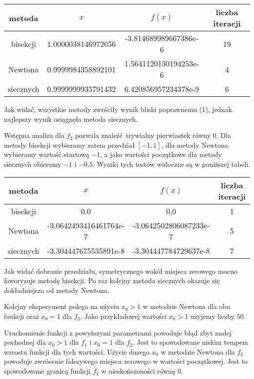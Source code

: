 \documentclass{article}
\begin{document}
\begin{tabular}{|c|c|c|c|}
\hline
metoda    & $x$                & $f(x)$                & liczba iteracji \\ \hline
bisekcji  & 1.0000038146972656 & -3.814689989667386e-6 & 19              \\ \hline
Newtona   & 0.9999984358892101 & 1.5641120130194253e-6 & 4               \\ \hline
siecznych & 0.9999999935791432 & 6.420856957234378e-9  & 6               \\ \hline
\end{tabular}

Jak widać, wszystkie metody zwróciły wynik bliski poprawnemu ($1$), jednak najlepszy wynik osiągnęła metoda siecznych.

Wstępna analiza dla $f_2$ pozwala znaleźć trywialny pierwiastek równy $0$.
Dla metody bisekcji wybieramy zatem przedział $[-1,1]$, dla metody Newtona wybieramy wartość startową $-1$, a jako wartości początkowe dla metody siecznych obieramy $-1$ i $-0.5$.
Wyniki tych testów widoczne są w poniższej tabeli.

\begin{tabular}{|c|c|c|c|}
\hline
metoda    & $x$                    & $f(x)$                 & liczba iteracji \\ \hline
bisekcji  & 0.0                    & 0,0                    & 1               \\ \hline
Newtona   & -3.0642493416461764e-7 & -3.0642502806087233e-7 & 5               \\ \hline
siecznych & -3.304447675535891e-8  & -3.304447784729637e-8  & 7               \\ \hline
\end{tabular}

Jak widać dobranie przedziału, symetrycznego wokół miejsca zerowego mocno faworyzuje metodę bisekcji.
Po raz kolejny metoda siecznych okazuje się dokładniejsza od metody Newtona.

Kolejny eksperyment polega na uźyciu $x_0>1$ w metodzie Newtona dla obu funkcji oraz $x_0=1$ dla $f_2$.
Jako przykładowej wartości $x_0>1$ użyjemy liczby $50$.

Uruchomienie funkcji z powyższymi parametrami powoduje błąd zbyt małej pochodnej dla $x_0>1$ dla $f_1$ i $x_0=1$ dla $f_2$.
Jest to spowodowane niskim tempem wzrostu funkcji dla tych wartości.
Użycie duzego $x_0$ w metodzie Newtona dla $f_2$ powoduje zwrócenie fałszywego miejsca zerowego w wartości początkowej.
Jest to spowodowane granicą funkcji $f_2$ w nieskończoności równą $0$.
\end{document}
